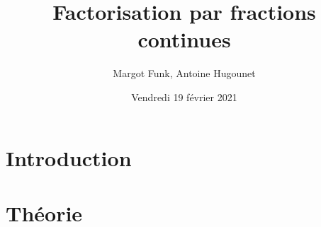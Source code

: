 \documentclass[serif, french, handout]{beamer}
\title{Factorisation par fractions continues}
\author{Margot Funk, Antoine Hugounet}
\date[]{Vendredi 19 février 2021}
\begin{document}
\begin{frame}
	\titlepage
\end{frame}

\section*{Introduction}


\section*{Théorie}

\end{document}

